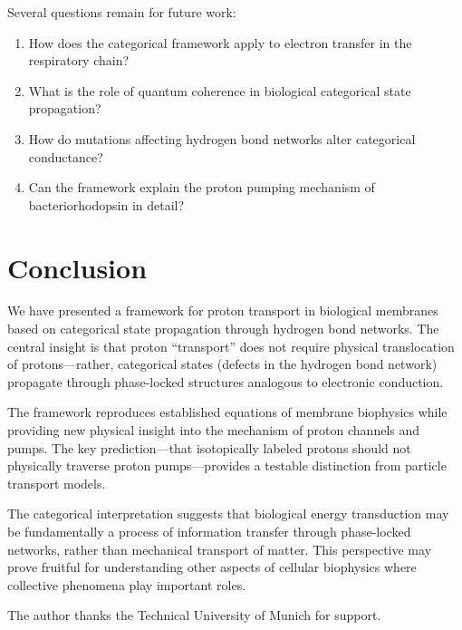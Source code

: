 \documentclass[twocolumn,showpacs,preprintnumbers,amsmath,amssymb,prd]{revtex4-2}
\begin{document}
Several questions remain for future work:

\begin{enumerate}
\item How does the categorical framework apply to electron transfer in the respiratory chain?
\item What is the role of quantum coherence in biological categorical state propagation?
\item How do mutations affecting hydrogen bond networks alter categorical conductance?
\item Can the framework explain the proton pumping mechanism of bacteriorhodopsin in detail?
\end{enumerate}


\section{Conclusion}

We have presented a framework for proton transport in biological membranes based on categorical state propagation through hydrogen bond networks. The central insight is that proton ``transport'' does not require physical translocation of protons---rather, categorical states (defects in the hydrogen bond network) propagate through phase-locked structures analogous to electronic conduction.

The framework reproduces established equations of membrane biophysics while providing new physical insight into the mechanism of proton channels and pumps. The key prediction---that isotopically labeled protons should not physically traverse proton pumps---provides a testable distinction from particle transport models.

The categorical interpretation suggests that biological energy transduction may be fundamentally a process of information transfer through phase-locked networks, rather than mechanical transport of matter. This perspective may prove fruitful for understanding other aspects of cellular biophysics where collective phenomena play important roles.

\begin{acknowledgments}
The author thanks the Technical University of Munich for support.
\end{acknowledgments}


\end{document}
